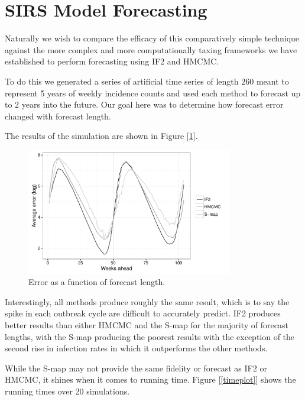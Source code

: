 \documentclass[12pt]{article}
\begin{document}
\section{SIRS Model Forecasting}

	Naturally we wish to compare the efficacy of this comparatively simple technique against the more complex and more computationally taxing frameworks we have established to perform forecasting using IF2 and HMCMC.

	To do this we generated a series of artificial time series of length $260$ meant to represent 5 years of weekly incidence counts and used each method to forecast up to 2 years into the future. Our goal here was to determine how forecast error changed with forecast length.

	The results of the simulation are shown in Figure [\ref{sseplot}].

	\begin{figure}[H]
        \centering
        \captionsetup{width=.8\linewidth}
        \includegraphics[width=0.8\textwidth]{./images/sseplot.pdf}
        \caption{Error as a function of forecast length.}
        \label{sseplot}
    \end{figure}

    Interestingly, all methods produce roughly the same result, which is to say the spike in each outbreak cycle are difficult to accurately predict. IF2 produces better results than either HMCMC and the S-map for the majority of forecast lengths, with the S-map producing the poorest results with the exception of the second rise in infection rates in which it outperforms the other methods.

    While the S-map may not provide the same fidelity or forecast as IF2 or HMCMC, it shines when it comes to running time. Figure [\ref{timeplot}] shows the running times over 20 simulations.
\end{document}

